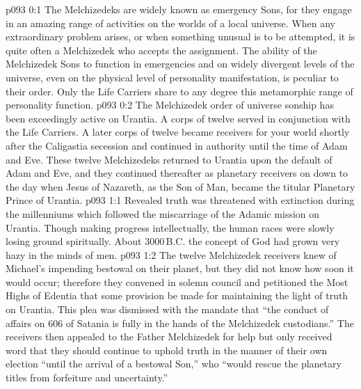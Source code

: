 \author{Melchizedek}
\vs p093 0:1 The Melchizedeks are widely known as emergency Sons, for they engage in an amazing range of activities on the worlds of a local universe. When any extraordinary problem arises, or when something unusual is to be attempted, it is quite often a Melchizedek who accepts the assignment. The ability of the Melchizedek Sons to function in emergencies and on widely divergent levels of the universe, even on the physical level of personality manifestation, is peculiar to their order. Only the Life Carriers share to any degree this metamorphic range of personality function.
\vs p093 0:2 \pc The Melchizedek order of universe sonship has been exceedingly active on Urantia. A corps of twelve served in conjunction with the Life Carriers. A later corps of twelve became receivers for your world shortly after the Caligastia secession and continued in authority until the time of Adam and Eve. These twelve Melchizedeks returned to Urantia upon the default of Adam and Eve, and they continued thereafter as planetary receivers on down to the day when Jesus of Nazareth, as the Son of Man, became the titular Planetary Prince of Urantia.
\vs p093 1:1 Revealed truth was threatened with extinction during the millenniums which followed the miscarriage of the Adamic mission on Urantia. Though making progress intellectually, the human races were slowly losing ground spiritually. About 3000\,B.C. the concept of God had grown very hazy in the minds of men.
\vs p093 1:2 The twelve Melchizedek receivers knew of Michael’s impending bestowal on their planet, but they did not know how soon it would occur; therefore they convened in solemn council and petitioned the Most Highs of Edentia that some provision be made for maintaining the light of truth on Urantia. This plea was dismissed with the mandate that “the conduct of affairs on 606 of Satania is fully in the hands of the Melchizedek custodians.” The receivers then appealed to the Father Melchizedek for help but only received word that they should continue to uphold truth in the manner of their own election “until the arrival of a bestowal Son,” who “would rescue the planetary titles from forfeiture and uncertainty.”
